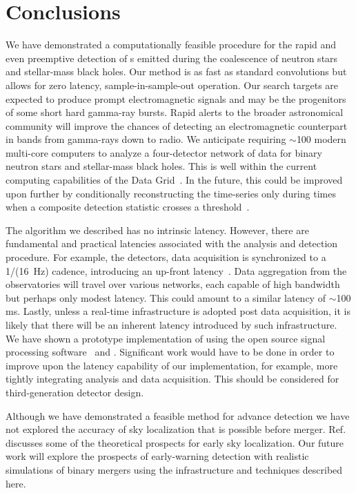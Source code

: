 \section{Conclusions}
\label{SECV}\label{sec:conclusions}

We have demonstrated a computationally feasible procedure for the rapid and
even preemptive detection of \GW{}s emitted during the coalescence
of neutron stars and stellar-mass black holes. Our method is as fast as
standard \fft{} convolutions but allows for zero latency, sample-in-sample-out
operation.  Our search targets are expected to produce prompt electromagnetic
signals and may be the progenitors of some short hard gamma-ray bursts.  Rapid
alerts to the broader astronomical community will improve the chances of
detecting an electromagnetic counterpart in bands from gamma-rays down to
radio.  We anticipate requiring $\sim$100 modern multi-core computers to
analyze a four-detector network of \GW{} data for binary neutron
stars and stellar-mass black holes.  This is well within the current computing
capabilities of the \LIGO{} Data Grid~\cite{LDG}. In the future, this could be
improved upon further by conditionally reconstructing the \SNR{} time-series
only during times when a composite detection statistic crosses a
threshold~\cite{svd-compdetstat}.

The algorithm we described has no intrinsic latency.  However, there are
fundamental and practical latencies associated with the analysis and detection
procedure. For example, the \LIGO{} detectors, data acquisition is synchronized
to a 1/(16~Hz) cadence, introducing an up-front latency~\cite{Bork2001}. Data
aggregation from the observatories will travel over various networks, each
capable of high bandwidth but perhaps only modest latency.  This could amount to
a similar latency of $\sim$100 ms.  Lastly, unless a real-time infrastructure
is adopted post data acquisition, it is likely that there will be an inherent
latency introduced by such infrastructure.  We have shown a prototype
implementation of \lloid{} using the open source signal processing software
\gstreamer\ and \gstlal. Significant work would have to be done in order to
improve upon the latency capability of our implementation, for example, more
tightly integrating analysis and data acquisition. This should be considered
for third-generation detector design.

Although we have demonstrated a feasible method for advance detection we have
not explored the accuracy of sky localization that is possible before merger.
Ref.~\cite{Fairhurst2009} discusses some of the theoretical prospects for early
sky localization.  Our future work will explore the prospects of early-warning
detection with realistic simulations of binary mergers using the infrastructure
and techniques described here. 

